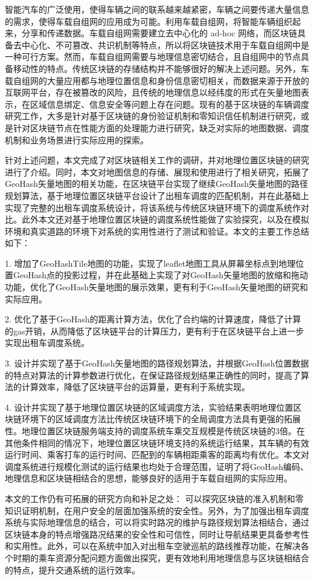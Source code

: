 

\begin{conclusion}

智能汽车的广泛使用，使得车辆之间的联系越来越紧密，车辆之间要传递大量信息的需求，使得车载自组网的应用成为可能。利用车载自组网，将智能车辆组织起来，分享和传递数据。车载自组网需要建立去中心化的 ad-hoc 网络，而区块链具备去中心化、不可篡改、共识机制等特点，所以将区块链技术用于车载自组网中是一种可行方案。然而，车载自组网需要与地理信息密切结合，且自组网中的节点具备移动性的特点。传统区块链的存储结构并不能够很好的解决上述问题。另外，车载自组网的大量应用都与地理位置信息和身份信息密切相关，而数据来源于开放的互联网平台，存在被篡改的风险，且传统的地理信息以经纬度的形式在矢量地图表示，在区域信息绑定、信息安全等问题上存在问题。现有的基于区块链的车辆调度研究工作，大多是针对基于区块链的身份验证机制和零知识信任机制进行研究，或是针对区块链节点在性能方面的处理能力进行研究，缺乏对实际的地图数据、调度机制和业务场景进行实际应用的探索。

针对上述问题，本文完成了对区块链相关工作的调研，并对地理位置区块链的研究进行了介绍。同时，本文对地图信息的存储、展现和使用进行了相关研究，拓展了GeoHash矢量地图的相关功能，在区块链平台实现了继续GeoHash矢量地图的路径规划算法，基于地理位置区块链平台设计了出租车调度的匹配机制，并在此基础上实现了完整的出租车调度系统设计，将该系统与传统区块链环境下的调度系统作对比。此外本文还对基于地理位置区块链的调度系统性能做了实验探究，以及在模拟环境和真实道路的环境下对系统的实用性进行了测试和验证。本文的主要工作总结如下：

1. 增加了GeoHashTile地图的功能，实现了leaflet地图工具从屏幕坐标点到地理位置GeoHash点的投影过程，并在此基础上实现了对GeoHash矢量地图的放缩和拖动功能，优化了GeoHash矢量地图的展示效果，更有利于GeoHash矢量地图的研究和实际应用。

2. 优化了基于GeoHash的距离计算方法，优化了合约端的计算速度，降低了计算的gas开销，从而降低了区块链平台的计算压力，更有利于在区块链平台上进一步实现出租车调度系统。

3. 设计并实现了基于GeoHash矢量地图的路径规划算法，并根据GeoHash位置数据的特点对算法的计算参数进行优化，在保证路径规划结果正确性的同时，提高了算法的计算效率，降低了区块链平台的运算量，更有利于系统实现。

4. 设计并实现了基于地理位置区块链的区域调度方法，实验结果表明地理位置区块链环境下的区域调度方法比传统区块链环境下的全局调度方法具有更强的拓展性。地理位置区块链服务端支持的调度系统车乘交互规模是传统区块链的3倍。在其他条件相同的情况下，地理位置区块链环境支持的系统运行结果，其车辆的有效运行时间、乘客打车的运行时间、匹配到的车辆相距乘客的距离均有优化。本文对调度系统进行规模化测试的运行结果也均处于合理范围，证明了将GeoHash编码、地理信息和区块链相结合的思想，能够良好的适用于车载自组网的实际应用。

本文的工作仍有可拓展的研究方向和补足之处：
可以探究区块链的准入机制和零知识证明机制，在用户安全的层面加强系统的安全性。另外，为了加强出租车调度系统与实际地理信息的结合，可以将实时路况的维护与路径规划算法相结合，通过区块链本身的特点增强路况结果的安全性和可信性，同时让导航结果更具备参考性和实用性。此外，可以在系统中加入对出租车空驶巡航的路线推荐功能，在解决各个时期的乘车资源分配问题方面做出探究，更有效地利用地理信息与区块链相结合的特点，提升交通系统的运行效率。

\end{conclusion}